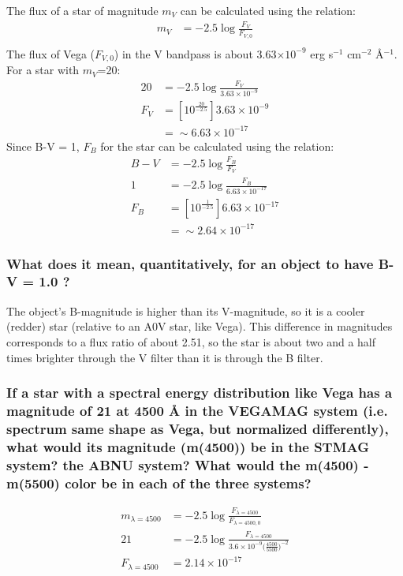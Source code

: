 \documentclass[12pt]{article}
\begin{document}
The flux of a star of magnitude
$m_V$ can be calculated using the relation:
\begin{align*}
    m_V &= -2.5 \log \frac{F_V}{F_{V,0}}\\
\end{align*}
The flux of Vega ($F_{V,0}$) in the V bandpass is about 3.63$\times10^{-9}$
erg s$^{-1}$ cm$^{-2}$ \AA{}$^{-1}$.
For a star with $m_V$=20:
\begin{align*}
    20 &= -2.5 \log \frac{F_V}{3.63\times10^{-9}}\\
    F_V &= [10^{\frac{20}{-2.5}}]3.63\times10^{-9}\\
    &= \sim6.63\times10^{-17}
\end{align*}
Since B-V = 1, $F_B$ for the star can be calculated using the
relation:
\begin{align*}
    B-V &= -2.5 \log \frac{F_B}{F_V}\\
    1 &= -2.5 \log \frac{F_B}{6.63\times10^{-17}}\\
    F_B &= [10^{\frac{1}{-2.5}}]6.63\times10^{-17}\\
    &= \sim2.64\times10^{-17}
\end{align*}

\subsubsection{
What does it mean, quantitatively, for an object to have B-V = 1.0 ?}

The object's B-magnitude is higher than its V-magnitude, so it is a
cooler (redder) star (relative to an A0V star, like Vega).
This difference in magnitudes
corresponds to a flux ratio of about 2.51, so the star is about two
and a half times brighter through the V filter than it is through the
B filter.

\subsubsection{
If a star with a spectral energy distribution like Vega has a
magnitude of 21 at 4500 \AA{} in the VEGAMAG system (i.e. spectrum same
shape as Vega, but normalized differently), what would its magnitude
(m(4500)) be in the STMAG system? the ABNU system? What would the
m(4500) - m(5500) color be in each of the three systems?
}

\begin{align*}
    m_{\lambda=4500} &= -2.5 \log \frac{F_{\lambda=4500}}
    {F_{\lambda=4500,0}}\\
    21 &= -2.5\log\frac{F_{\lambda=4500}}{3.6\times10^{-9}
    \Big(\frac{4500}{5500}\Big)^{-2}}\\
    F_{\lambda=4500} &= 2.14\times10^{-17}
\end{align*}
\end{document}
